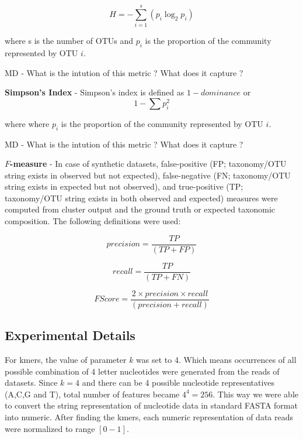 \documentclass[10pt, conference, compsocconf]{IEEEtran}
\begin{document}
\begin{equation}
H={-} \sum_{i=1}^{s} \left( p_i\log_2p_i \right)
\end{equation}

where s is the number of OTUs and $p_i$ is the proportion of the community represented by OTU $i$.

MD - What is the intution of this metric ? What does it capture ? 

\hspace*{4mm}\textbf{Simpson's Index} - Simpson’s index is defined as ${1-dominance}$ or
\begin{equation}
1 - \sum p_i^2
\end{equation}

where where $p_i$ is the proportion of the community represented by OTU $i$.

MD - What is the intution of this metric ? What does it capture ? 

\hspace*{4mm}\textbf{$F$-measure} - In case of 
synthetic datasets, false-positive (FP; taxonomy/OTU string 
exists in observed but not expected), false-negative
(FN; taxonomy/OTU string exists in expected but not observed), and 
true-positive (TP; taxonomy/OTU string exists in both observed and expected) measures were computed from 
cluster output and the ground truth or expected taxonomic composition. The following definitions were used:

\begin{equation}
precision = \frac{TP}{(TP + FP)}
\end{equation}

\begin{equation}
recall = \frac{TP}{(TP + FN)}
\end{equation}

\begin{equation}
F Score = \frac{2 \times precision \times recall}{(precision + recall)}
\end{equation}


\subsection{Experimental Details}

For kmers, the value of parameter $k$ was set to 4. Which means occurrences of all possible combination of 4 letter nucleotides were generated from the reads of datasets. Since $k=4$ and there can be 4 possible nucleotide representatives (A,C,G and T), total number of features became $4^4=256$. This way we were able to convert the string representation of nucleotide data in standard FASTA format into numeric. After finding the kmers, each numeric representation of data reads were normalized to range $\left[0-1\right]$.
\end{document}
